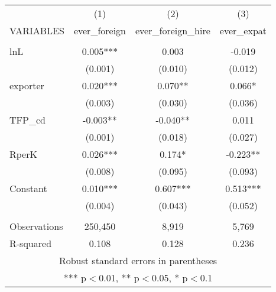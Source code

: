 \begin{tabular}{lccc} \hline
 & (1) & (2) & (3) \\
VARIABLES & ever\_foreign & ever\_foreign\_hire & ever\_expat \\ \hline
 &  &  &  \\
lnL & 0.005*** & 0.003 & -0.019 \\
 & (0.001) & (0.010) & (0.012) \\
exporter & 0.020*** & 0.070** & 0.066* \\
 & (0.003) & (0.030) & (0.036) \\
TFP\_cd & -0.003** & -0.040** & 0.011 \\
 & (0.001) & (0.018) & (0.027) \\
RperK & 0.026*** & 0.174* & -0.223** \\
 & (0.008) & (0.095) & (0.093) \\
Constant & 0.010*** & 0.607*** & 0.513*** \\
 & (0.004) & (0.043) & (0.052) \\
 &  &  &  \\
Observations & 250,450 & 8,919 & 5,769 \\
 R-squared & 0.108 & 0.128 & 0.236 \\ \hline
\multicolumn{4}{c}{ Robust standard errors in parentheses} \\
\multicolumn{4}{c}{ *** p$<$0.01, ** p$<$0.05, * p$<$0.1} \\
\end{tabular}
